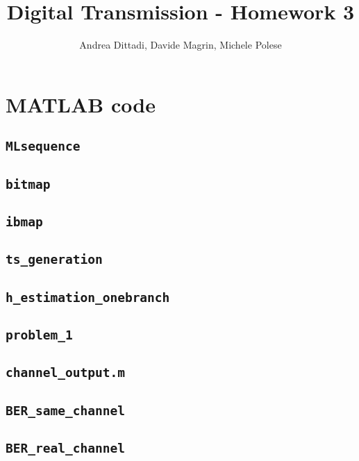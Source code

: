 \documentclass[10pt]{article}
\numberwithin{equation}{section}
\begin{document}
\title{Digital Transmission - Homework 3}
\author{Andrea Dittadi, Davide Magrin, Michele Polese}

\maketitle

\section*{MATLAB code}

\subsection*{\texttt{MLsequence}}
 \pagebreak
\subsection*{\texttt{bitmap}}

\subsection*{\texttt{ibmap}}
 \pagebreak
\subsection*{\texttt{ts\_generation}}

\subsection*{\texttt{h\_estimation\_onebranch}}
 \pagebreak

\subsection*{\texttt{problem\_1}}

\subsection*{\texttt{channel\_output.m}}


\subsection*{\texttt{BER\_same\_channel}}

\subsection*{\texttt{BER\_real\_channel}}

\end{document}
